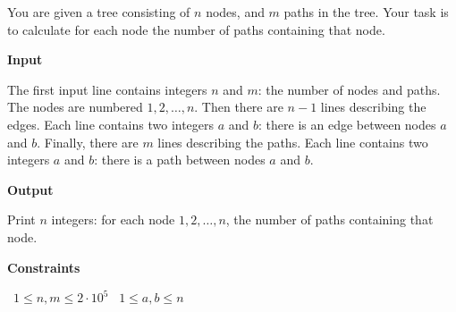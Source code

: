 You are given a tree consisting of $n$ nodes, and $m$ paths in the tree.
Your task is to calculate for each node the number of paths containing that node.

\vspace{0.3cm}\noindent\textbf{Input}

The first input line contains integers $n$ and $m$: the number of nodes and paths. The nodes are numbered $1,2,\ldots,n$.
Then there are $n-1$ lines describing the edges. Each line contains two integers $a$ and $b$: there is an edge between nodes $a$ and $b$.
Finally, there are $m$ lines describing the paths. Each line contains two integers $a$ and $b$: there is a path between nodes $a$ and $b$.

\vspace{0.3cm}\noindent\textbf{Output}

Print $n$ integers: for each node $1,2,\ldots,n$, the number of paths containing that node.

\vspace{0.3cm}\noindent\textbf{Constraints}

\textbullet\ $1 \le n, m \le 2 \cdot 10^5$
\textbullet\ $1 \le a,b \le n$